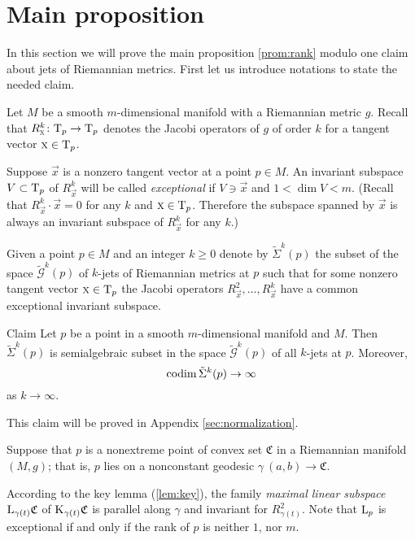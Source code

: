 \documentclass[a4paper,10pt]{article}
\begin{document}
\section{Main proposition}

In this section we will prove the main proposition \ref{prom:rank} modulo one claim about jets of Riemannian metrics.
First let us introduce notations to state the needed claim.

Let $M$ be a smooth $m$-dimensional manifold with a Riemannian metric $g$.
Recall that $R^k_{\text{\sc{x}}}\colon\mathrm{T}_p\to\mathrm{T}_p$ denotes the Jacobi operators of $g$ of order $k$ for a tangent vector $\text{\sc{x}}\in\mathrm{T}_p$.

Suppose $\vec x$ is a nonzero tangent vector at a point $p\in M$.
An invariant subspace $V\subset \mathrm{T}_p$ of $R^k_\vec x$ will be called \emph{exceptional} if $V\ni \vec x$ and $1< \dim V<m$.
(Recall that $R^k_\vec x\cdot \vec x=0$
for any $k$ and $\text{\sc{x}}\in \mathrm{T}_p$.
Therefore the subspace spanned by $\vec x$ is always an invariant subspace of $R^k_\vec x$ for any $k$.)


Given a point $p\in M$ and an integer $k\ge0$ denote by $\tilde\Sigma^k(p)$ the subset of the space $\tilde{\mathcal{G}}^k(p)$ of $k$-jets of Riemannian metrics at $p$ such that for some nonzero tangent vector $\text{\sc{x}}\in\mathrm{T}_p$ the Jacobi operators $R^2_\vec x,\dots,R^k_\vec x$ have a common exceptional invariant subspace.


\begin{thm}{Claim}\label{clm:codim-sigma} 
Let $p$ be a point in a smooth $m$-dimensional manifold and $M$.
Then $\tilde\Sigma^k(p)$ is semialgebraic subset in the space $\tilde{\mathcal{G}}^k(p)$ of all $k$-jets at $p$.
Moreover, 
\[\operatorname{\rm codim}\tilde\Sigma^k(p)\to\infty\] 
as $k\to\infty$.
\end{thm}

This claim will be proved in Appendix \ref{sec:normalization}.

Suppose that $p$ is a nonextreme point of convex set $\mathfrak{C}$ in a Riemannian manifold $(M,g)$;
that is, $p$ lies on a nonconstant geodesic $\gamma\:(a,b)\to\mathfrak{C}$.

According to the key lemma (\ref{lem:key}), the family \emph{maximal linear subspace} $\mathrm{L}_{\gamma(t)}\mathfrak{C}$ of $\mathrm{K}_{\gamma(t)}\mathfrak{C}$ is parallel along $\gamma$ and invariant for $R^2_{\gamma(t)}$.
Note that $\mathrm{L}_p$ is exceptional if and only if the rank of $p$ is neither $1$, nor $m$.
\end{document}
